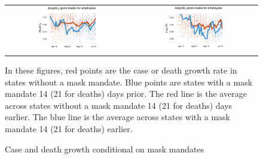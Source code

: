 \documentclass[11pt,reqno,letter]{amsart}
\theoremstyle{definition}
\begin{document}
\begin{figure}[ht]
  \caption{Case and death growth conditional on mask mandates \label{fig:masks}}\vspace{0.2cm}
 \begin{minipage}{\linewidth}
    \centering
    \begin{tabular}{cc}
      \includegraphics[width=0.5\textwidth]{tables_and_figures/pmaskbus-cases-14}
      &
        \includegraphics[width=0.5\textwidth]{tables_and_figures/pmaskbus-deaths-21}
    \end{tabular}
    \begin{flushleft}
      \scriptsize In these figures, red points are the case or death
      growth rate in states without a mask mandate. Blue points are
      states with a mask mandate 14 (21 for deaths) days prior. The
      red line is the average across states without a mask mandate 14
      (21 for deaths) days earlier. The blue line is the average
      across states with a mask mandate 14 (21 for deaths) earlier.
    \end{flushleft}
  \end{minipage}%
\end{figure}  
\end{document}
